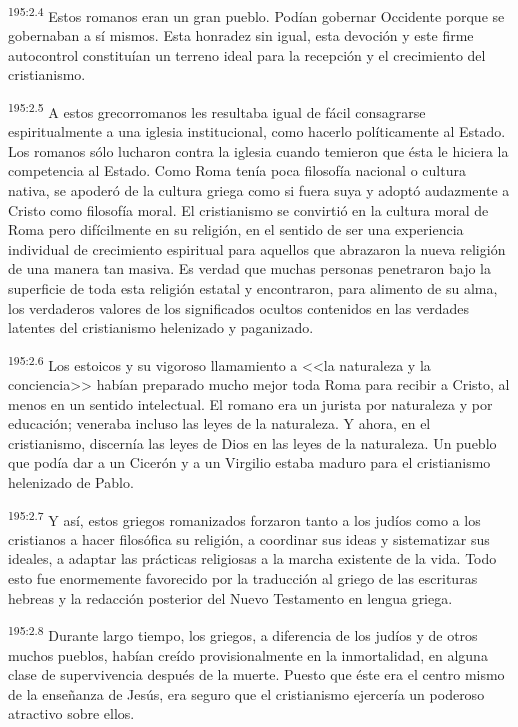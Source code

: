 \par 
\textsuperscript{195:2.4} Estos romanos eran un gran pueblo. Podían gobernar Occidente porque se gobernaban a sí mismos. Esta honradez sin igual, esta devoción y este firme autocontrol constituían un terreno ideal para la recepción y el crecimiento del cristianismo.

\par 
\textsuperscript{195:2.5} A estos grecorromanos les resultaba igual de fácil consagrarse espiritualmente a una iglesia institucional, como hacerlo políticamente al Estado. Los romanos sólo lucharon contra la iglesia cuando temieron que ésta le hiciera la competencia al Estado. Como Roma tenía poca filosofía nacional o cultura nativa, se apoderó de la cultura griega como si fuera suya y adoptó audazmente a Cristo como filosofía moral. El cristianismo se convirtió en la cultura moral de Roma pero difícilmente en su religión, en el sentido de ser una experiencia individual de crecimiento espiritual para aquellos que abrazaron la nueva religión de una manera tan masiva. Es verdad que muchas personas penetraron bajo la superficie de toda esta religión estatal y encontraron, para alimento de su alma, los verdaderos valores de los significados ocultos contenidos en las verdades latentes del cristianismo helenizado y paganizado.

\par 
\textsuperscript{195:2.6} Los estoicos y su vigoroso llamamiento a <<la naturaleza y la conciencia>> habían preparado mucho mejor toda Roma para recibir a Cristo, al menos en un sentido intelectual. El romano era un jurista por naturaleza y por educación; veneraba incluso las leyes de la naturaleza. Y ahora, en el cristianismo, discernía las leyes de Dios en las leyes de la naturaleza. Un pueblo que podía dar a un Cicerón y a un Virgilio estaba maduro para el cristianismo helenizado de Pablo.

\par 
\textsuperscript{195:2.7} Y así, estos griegos romanizados forzaron tanto a los judíos como a los cristianos a hacer filosófica su religión, a coordinar sus ideas y sistematizar sus ideales, a adaptar las prácticas religiosas a la marcha existente de la vida. Todo esto fue enormemente favorecido por la traducción al griego de las escrituras hebreas y la redacción posterior del Nuevo Testamento en lengua griega.

\par 
\textsuperscript{195:2.8} Durante largo tiempo, los griegos, a diferencia de los judíos y de otros muchos pueblos, habían creído provisionalmente en la inmortalidad, en alguna clase de supervivencia después de la muerte. Puesto que éste era el centro mismo de la enseñanza de Jesús, era seguro que el cristianismo ejercería un poderoso atractivo sobre ellos.


